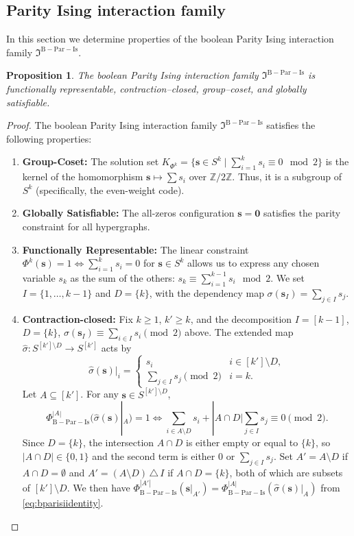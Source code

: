 \documentclass[11pt,reqno]{amsart}
\newcommand{\vecs}{\boldsymbol{s}}
\newcommand{\veco}{\boldsymbol{0}}
\newcommand{\mcib}{\mathfrak{I}^{\mathrm{B-Par-Is}}}
\newcommand{\PhibIs}{\Phi_{\mathrm{B-Par-Is}}}
\theoremstyle{plain}
\newtheorem{proposition}[theorem]{Proposition}
\theoremstyle{definition}
\numberwithin{equation}{section}
\begin{document}
\subsection{Parity Ising interaction family}
\label{Sec:Isingmodel}

In this section we determine properties of the boolean Parity Ising interaction family $\mcib$.
\begin{proposition}
\label{prop:mcib_properties}
The boolean Parity Ising interaction family $\mcib$ is functionally representable,
contraction--closed, group--coset, and globally satisfiable.
\end{proposition}

\begin{proof}
    The boolean Parity Ising interaction family $\mcib$ satisfies the following properties:
    \begin{enumerate}
        \item \textbf{Group-Coset:} The solution set $K_{\Phi^k} = \{ \vecs \in S^k \mid \sum_{i=1}^k s_i \equiv 0 \mod 2 \}$ is the kernel of the homomorphism $\vecs \mapsto \sum s_i$ over $\mathbb{Z}/2\mathbb{Z}$. Thus, it is a subgroup of $S^k$ (specifically, the even-weight code).
        \item \textbf{Globally Satisfiable:} The all-zeros configuration $\vecs = \veco$ satisfies the parity constraint for all hypergraphs.
        \item \textbf{Functionally Representable:} The linear constraint $\Phi^k(\vecs) = 1 \Leftrightarrow \sum_{i=1}^k s_i = 0$ for $\vecs \in S^k$ allows us to express any chosen variable $s_k$ as the sum of the others: $s_k \equiv \sum_{i=1}^{k-1} s_i \mod 2$. We set $I = \{1, \dots, k-1\}$ and $D=\{k\}$, with the dependency map $\sigma(\vecs_I) = \sum_{j \in I} s_j$.
        \item \textbf{Contraction-closed:} Fix $k \geq 1$, $k' \geq k$, and the decomposition $I = [k-1]$, $D = \{k\}$, $\sigma(\vecs_I) \equiv \sum_{i \in I} s_i \pmod 2$ above. The extended map $\hat\sigma \colon S^{[k'] \setminus D} \to S^{[k']}$ acts by
        \[
            \hat\sigma(\vecs)|_i = \begin{cases} s_i & i \in [k'] \setminus D, \\ \sum_{j \in I} s_j \pmod 2 & i = k. \end{cases}
        \]
        Let $A \subseteq [k']$. For any $\vecs \in S^{[k'] \setminus D}$,
        \begin{equation}
            \label{eq:bparisiidentity}
            \PhibIs^{|A|}(\hat\sigma(\vecs)|_A) = 1 \iff \sum_{i \in A \setminus D} s_i + |A \cap D| \sum_{j \in I} s_j \equiv 0 \pmod 2.
        \end{equation}
        Since $D = \{k\}$, the intersection $A \cap D$ is either empty or equal to $\{k\}$, so $|A \cap D| \in \{0, 1\}$ and the second term is either $0$ or $\sum_{j \in I} s_j$. Set $A' = A \setminus D$ if $A \cap D = \emptyset$ and $A' = (A \setminus D) \,\triangle\, I$ if $A \cap D = \{k\}$, both of which are subsets of $[k'] \setminus D$. We then have $\PhibIs^{|A'|}(\vecs|_{A'}) = \PhibIs^{|A|}(\hat{\sigma}(\vecs)|_A)$ from \eqref{eq:bparisiidentity}. \qedhere
    \end{enumerate}
\end{proof}
\end{document}
